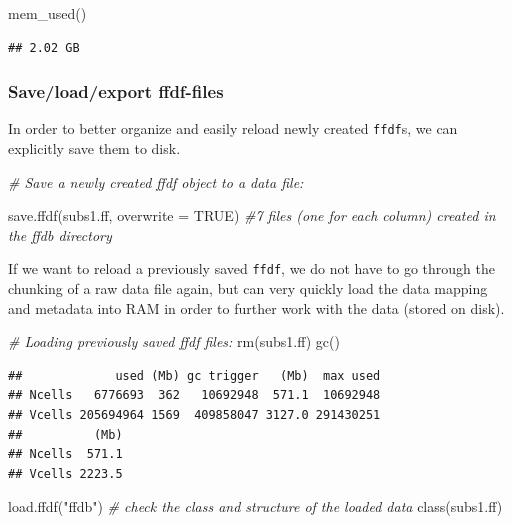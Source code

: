 \documentclass[
  12pt,
]{style/krantz}
\newenvironment{Shaded}{\begin{snugshade}}{\end{snugshade}}
\newcommand{\AttributeTok}[1]{\textcolor[rgb]{0.77,0.63,0.00}{#1}}
\newcommand{\CommentTok}[1]{\textcolor[rgb]{0.56,0.35,0.01}{\textit{#1}}}
\newcommand{\ConstantTok}[1]{\textcolor[rgb]{0.00,0.00,0.00}{#1}}
\newcommand{\FunctionTok}[1]{\textcolor[rgb]{0.00,0.00,0.00}{#1}}
\newcommand{\NormalTok}[1]{#1}
\newcommand{\StringTok}[1]{\textcolor[rgb]{0.31,0.60,0.02}{#1}}
\begin{document}
\begin{Shaded}
\begin{Highlighting}[]
\FunctionTok{mem\_used}\NormalTok{()}
\end{Highlighting}
\end{Shaded}

\begin{verbatim}
## 2.02 GB
\end{verbatim}

\hypertarget{saveloadexport-ffdf-files}{%
\subsubsection{Save/load/export ffdf-files}\label{saveloadexport-ffdf-files}}

In order to better organize and easily reload newly created \texttt{ffdf}s, we can explicitly save them to disk.

\begin{Shaded}
\begin{Highlighting}[]
\CommentTok{\# Save a newly created ffdf object to a data file:}

\FunctionTok{save.ffdf}\NormalTok{(subs1.ff, }\AttributeTok{overwrite =} \ConstantTok{TRUE}\NormalTok{) }\CommentTok{\#7 files (one for each column) created in the ffdb directory}
\end{Highlighting}
\end{Shaded}

If we want to reload a previously saved \texttt{ffdf}, we do not have to go through the chunking of a raw data file again, but can very quickly load the data mapping and metadata into RAM in order to further work with the data (stored on disk).

\begin{Shaded}
\begin{Highlighting}[]
\CommentTok{\# Loading previously saved ffdf files:}
\FunctionTok{rm}\NormalTok{(subs1.ff)}
\FunctionTok{gc}\NormalTok{()}
\end{Highlighting}
\end{Shaded}

\begin{verbatim}
##             used (Mb) gc trigger   (Mb)  max used
## Ncells   6776693  362   10692948  571.1  10692948
## Vcells 205694964 1569  409858047 3127.0 291430251
##          (Mb)
## Ncells  571.1
## Vcells 2223.5
\end{verbatim}

\begin{Shaded}
\begin{Highlighting}[]
\FunctionTok{load.ffdf}\NormalTok{(}\StringTok{"ffdb"}\NormalTok{)}
\CommentTok{\# check the class and structure of the loaded data}
\FunctionTok{class}\NormalTok{(subs1.ff) }
\end{Highlighting}
\end{Shaded}
\end{document}
